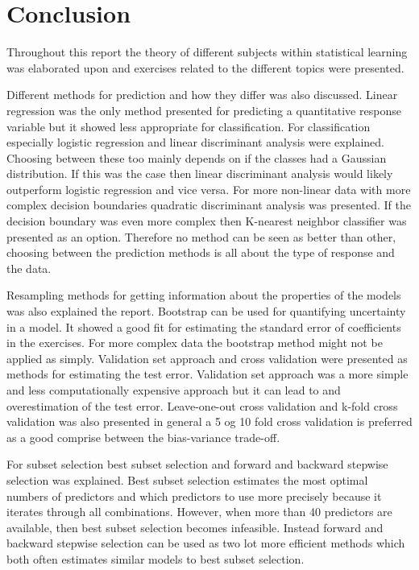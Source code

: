 \chapter{Conclusion}
\label{chp:conc}

Throughout this report the theory of different subjects within statistical learning was elaborated upon and exercises related to the different topics were presented. 

Different methods for prediction and how they differ was also discussed. Linear regression was the only method presented for predicting a quantitative response variable but it showed less appropriate for classification. For classification especially logistic regression and linear discriminant analysis were explained. Choosing between these too mainly depends on if the classes had a Gaussian distribution. If this was the case then linear discriminant analysis would likely outperform logistic regression and vice versa. For more non-linear data with more complex decision boundaries quadratic discriminant analysis was presented. If the decision boundary was even more complex then K-nearest neighbor classifier was presented as an option. Therefore no method can be seen as better than other, choosing between the prediction methods is all about the type of response and the data.

Resampling methods for getting information about the properties of the models was also explained the report. Bootstrap can be used for quantifying uncertainty in a model. It showed a good fit for estimating the standard error of coefficients in the exercises. For more complex data the bootstrap method might not be applied as simply.
Validation set approach and cross validation were presented as methods for estimating the test error. Validation set approach was a more simple and less computationally expensive approach but it can lead to and overestimation of the test error. Leave-one-out cross validation and k-fold cross validation was also presented in general a 5 og 10 fold cross validation is preferred as a good comprise between the bias-variance trade-off.

For subset selection best subset selection and forward and backward stepwise selection was explained. Best subset selection estimates the most optimal numbers of predictors and which predictors to use more precisely because it iterates through all combinations. However, when more than 40 predictors are available, then best subset selection becomes infeasible. Instead forward and backward stepwise selection can be used as two lot more efficient methods which both often estimates similar models to best subset selection.

